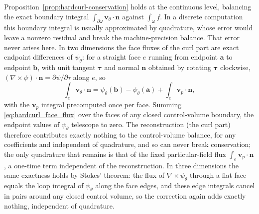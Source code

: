 \documentclass[a4paper,fleqn]{cas-sc}
\newcommand{\vflux}{\mathbf{v}}
\newcommand{\curl}{\nabla\times}          %
\newcommand{\vp}{\vflux_{p}}              %
\begin{document}
Proposition~\ref{prop:hardcurl-conservation} holds at the continuous level,
balancing the exact boundary integral
\(\int_{\partial\omega}\vflux_\theta\cdot\mathbf{n}\) against \(\int_\omega f\).
In a discrete computation this boundary integral is usually approximated by
quadrature, whose error would leave a nonzero residual and break the
machine-precision balance. That error never arises here. In two dimensions the face
fluxes of the curl part are exact endpoint differences of \(\psi_\theta\): for a
straight face \(e\) running from endpoint \(\mathbf{a}\) to endpoint
\(\mathbf{b}\), with
unit tangent \(\bm\tau\) and normal \(\mathbf{n}\) obtained by rotating
\(\bm\tau\) clockwise, \((\curl\psi)\cdot\mathbf{n}=\partial\psi/\partial\tau\)
along \(e\), so
\begin{equation}
  \int_e \vflux_\theta\cdot\mathbf{n}
  =
  \psi_\theta(\mathbf{b})-\psi_\theta(\mathbf{a})
  +
  \int_e \vp\cdot\mathbf{n} ,
  \label{eq:hardcurl_face_flux}
\end{equation}
with the \(\vp\) integral precomputed once per face. Summing
\eqref{eq:hardcurl_face_flux} over the faces of any closed control-volume
boundary, the endpoint values of \(\psi_\theta\) telescope to zero. The
reconstruction (the curl part) therefore contributes exactly nothing to the
control-volume balance, for any coefficients and independent of quadrature, and
so can never break conservation; the only quadrature that remains is that of the
fixed particular-field flux \(\int_e\vp\cdot\mathbf{n}\), a one-time term
independent of the reconstruction. In three dimensions the same exactness holds by
Stokes' theorem: the flux of \(\nabla\times\psi_\theta\) through a flat face
equals the loop integral of \(\psi_\theta\) along the face edges, and these
edge integrals cancel in pairs around any closed control volume, so the correction
again adds exactly nothing, independent of quadrature.
\end{document}
